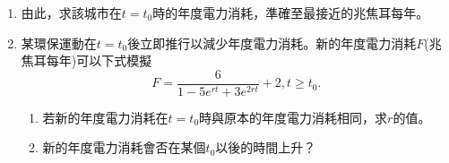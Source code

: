 \documentclass[12pt]{article}
\begin{document}
\begin{enumerate}
\begin{enumerate}
\begin{enumerate}
                \item 由此，求該城市在$t=t_0$時的年度電力消耗，準確至最接近的兆焦耳每年。
                \item 某環保運動在$t=t_0$後立即推行以減少年度電力消耗。新的年度電力消耗$F$(兆焦耳每年)可以下式模擬\[F=\frac{6}{1-5e^{rt}+3e^{2rt}}+2, t\geq t_0.\]\begin{enumerate}
                    \item 若新的年度電力消耗在$t=t_0$時與原本的年度電力消耗相同，求$r$的值。
                    \item 新的年度電力消耗會否在某個$t_0$以後的時間上升？
                \end{enumerate}
            \end{enumerate}
        \end{enumerate}
    \end{enumerate}
\end{document}
